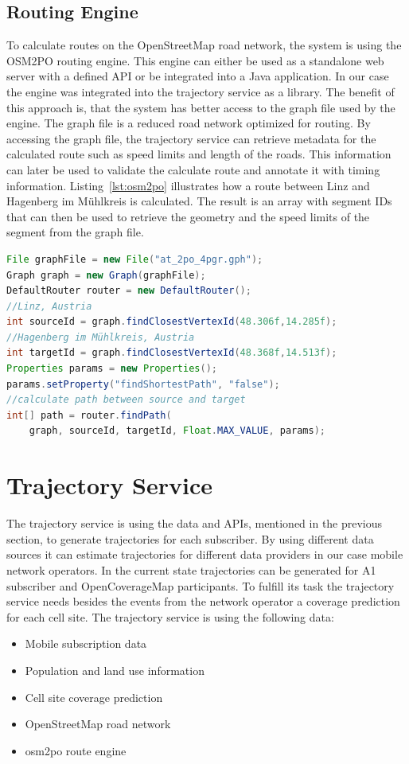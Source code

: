 \documentclass[master,english]{hgbthesis}
\begin{document}
\subsection{Routing Engine}
To calculate routes on the OpenStreetMap road network, the system is using the OSM2PO routing engine. This engine can either be used as a standalone web server with a defined API or be integrated into a Java application. In our case the engine was integrated into the trajectory service as a library. The benefit of this approach is, that the system has better access to the graph file used by the engine. The graph file is a reduced road network optimized for routing. By accessing the graph file, the trajectory service can retrieve metadata for the calculated route such as speed limits and length of the roads. This information can later be used to validate the calculate route and annotate it with timing information.
Listing~\ref{lst:osm2po} illustrates how a route between Linz and Hagenberg im Mühlkreis is calculated. The result is an array with segment IDs that can then be used to retrieve the geometry and the speed limits of the segment from the graph file.
\begin{lstlisting}[language=Java,style=JAVA,caption={Example code to calculate a route between two points},label={lst:osm2po}]
File graphFile = new File("at_2po_4pgr.gph");
Graph graph = new Graph(graphFile);
DefaultRouter router = new DefaultRouter();
//Linz, Austria
int sourceId = graph.findClosestVertexId(48.306f,14.285f);
//Hagenberg im Mühlkreis, Austria
int targetId = graph.findClosestVertexId(48.368f,14.513f);
Properties params = new Properties();
params.setProperty("findShortestPath", "false");
//calculate path between source and target
int[] path = router.findPath(
    graph, sourceId, targetId, Float.MAX_VALUE, params);
\end{lstlisting}
\section{Trajectory Service}
The trajectory service is using the data and APIs, mentioned in the previous section, to generate trajectories for each subscriber. By using different data sources it can estimate trajectories for different data providers in our case mobile network operators. In the current state trajectories can be generated for A1 subscriber and OpenCoverageMap participants. To fulfill its task the trajectory service needs besides the events from the network operator a coverage prediction for each cell site. The trajectory service is using the following data:
\begin{itemize}
\item Mobile subscription data
\item Population and land use information
\item Cell site coverage prediction
\item OpenStreetMap road network
\item osm2po route engine
\end{itemize}
\end{document}
